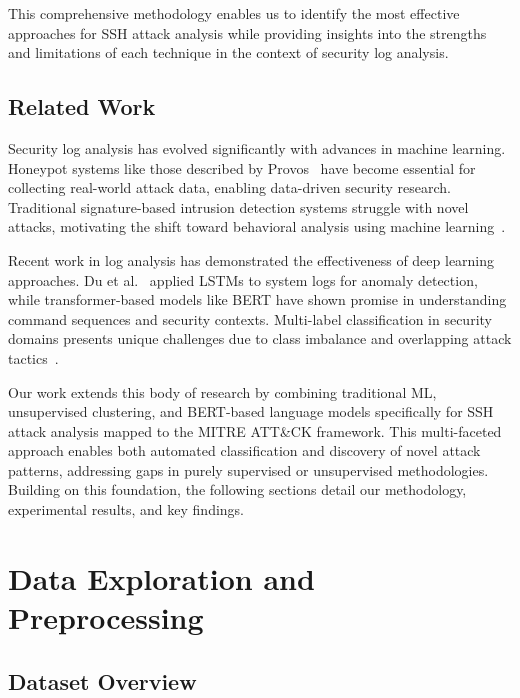 \documentclass[acmlarge,screen,nonacm]{acmart}
\begin{document}
This comprehensive methodology enables us to identify the most effective approaches for SSH attack analysis while providing insights into the strengths and limitations of each technique in the context of security log analysis.

\subsection{Related Work}

Security log analysis has evolved significantly with advances in machine learning. Honeypot systems like those described by Provos~\cite{honeypot_ssh} have become essential for collecting real-world attack data, enabling data-driven security research. Traditional signature-based intrusion detection systems struggle with novel attacks, motivating the shift toward behavioral analysis using machine learning~\cite{intrusion_detection_ml}.

Recent work in log analysis has demonstrated the effectiveness of deep learning approaches. Du et al.~\cite{log_analysis_ml} applied LSTMs to system logs for anomaly detection, while transformer-based models like BERT have shown promise in understanding command sequences and security contexts. Multi-label classification in security domains presents unique challenges due to class imbalance and overlapping attack tactics~\cite{tsoumakas2007multi}.

Our work extends this body of research by combining traditional ML, unsupervised clustering, and BERT-based language models specifically for SSH attack analysis mapped to the MITRE ATT\&CK framework. This multi-faceted approach enables both automated classification and discovery of novel attack patterns, addressing gaps in purely supervised or unsupervised methodologies. Building on this foundation, the following sections detail our methodology, experimental results, and key findings.

\section{Data Exploration and Preprocessing}

\subsection{Dataset Overview}
\end{document}
